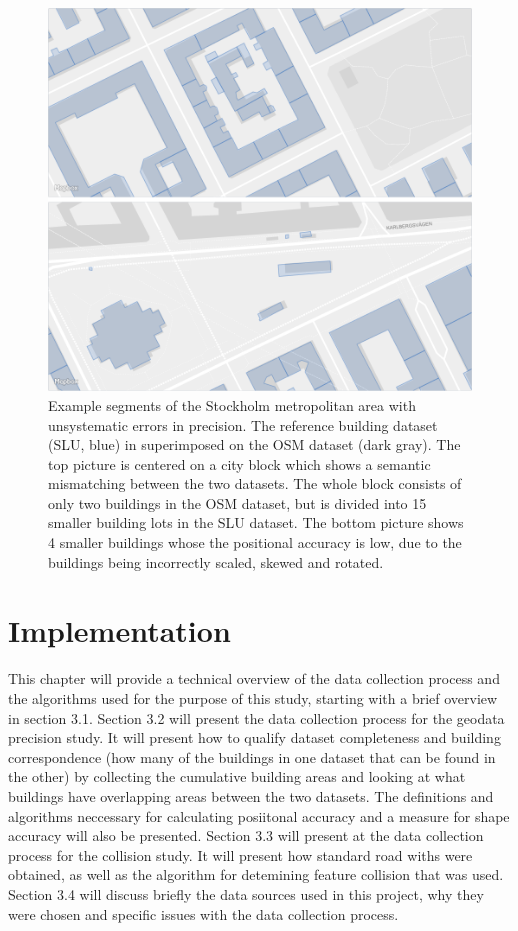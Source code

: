 \documentclass{kththesis}
\begin{document}
\begin{figure}[H]
    \centering
    \includegraphics[width=\textwidth,height=0.5\textheight,keepaspectratio]{img_map_compare}
    \caption{Example segments of the Stockholm metropolitan area with unsystematic errors in precision. The reference building dataset (SLU, blue) in superimposed on the OSM dataset (dark gray). The top picture is centered on a city block which shows a semantic mismatching between the two datasets. The whole block consists of only two buildings in the OSM dataset, but is divided into 15 smaller building lots in the SLU dataset. The bottom picture shows 4 smaller buildings whose the positional accuracy is low, due to the buildings being incorrectly scaled, skewed and rotated.}
    \label{fig:osm-slu-map}
\end{figure}

\chapter{Implementation}

This chapter will provide a technical overview of the data collection process and the algorithms used for the purpose of this study, starting with a brief overview in section 3.1.
Section 3.2 will present the data collection process for the geodata precision study. It will present how to qualify dataset completeness and building correspondence (how many of the buildings in one dataset that can be found in the other) by collecting the cumulative building areas and looking at what buildings have overlapping areas between the two datasets.
The definitions and algorithms neccessary for calculating posiitonal accuracy and a measure for shape accuracy will also be presented.
Section 3.3 will present at the data collection process for the collision study. It will present how standard road withs were obtained, as well as the algorithm for detemining feature collision that was used.
Section 3.4 will discuss briefly the data sources used in this project, why they were chosen and specific issues with the data collection process.
\end{document}
